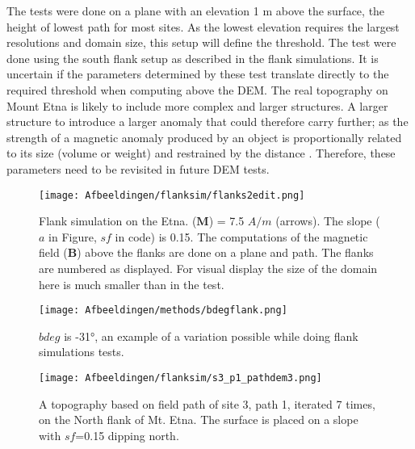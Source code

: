 \par The tests were done on a plane with an elevation 1 m above the surface, the height of lowest path for most sites. As the lowest elevation requires the largest resolutions and domain size, this setup will define the threshold. The test were done using the south flank setup as described in the flank simulations. It is uncertain if the parameters determined by these test translate directly to the required threshold when computing above the DEM.  The real topography on Mount Etna is likely to include more complex and larger structures. A larger structure to introduce a larger anomaly that could therefore carry further; as the strength of a magnetic anomaly produced by an object is proportionally related to its size (volume or weight) and restrained by the distance \parencite{GRIFFITHS}.  Therefore, these parameters need to be revisited in future DEM tests. \\
\begin{figure}
\centering
   \texttt{[image: Afbeeldingen/flanksim/flanks2edit.png]}
    \caption{Flank simulation on the Etna. ($\mathbf{M}$) = 7.5 $A/m$ (arrows). The slope ($a$ in Figure, $sf$ in code) is 0.15. The computations of the magnetic field ($\mathbf{B}$) above the flanks are done on a plane and path. The flanks are numbered as displayed. For visual display the size of the domain here is much smaller than in the test.}
    \label{fig:flanksim}
\end{figure}
\begin{figure}
\centering
   \texttt{[image: Afbeeldingen/methods/bdegflank.png]}
    \caption{$bdeg$ is \ang{-31}, an example of a variation possible while doing flank simulations tests.}
    \label{fig:bdeg}
\end{figure}
\begin{figure}
\centering
   \texttt{[image: Afbeeldingen/flanksim/s3\_p1\_pathdem3.png]}
    \caption{A topography based on field path of site 3, path 1, iterated 7 times, on the North flank of Mt. Etna. The surface is placed on a slope with $sf$=0.15 dipping north.}
    \label{fig:dempath}
\end{figure}

